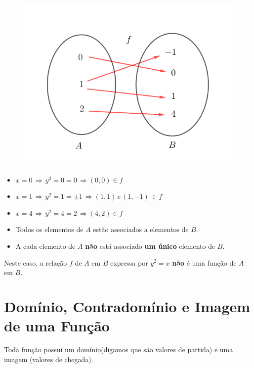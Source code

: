 \begin{enumerate}
\begin{figure}[H]
	\includegraphics[scale=3.5]{imagens/funcao-ex3.png}

\end{figure}

\begin{itemize}
\item $x= 0 \, \Rightarrow \,y^2 = 0 = 0 \, \Rightarrow (0,0) \in f $
\item $x= 1 \, \Rightarrow \,y^2 = 1 = \pm 1  \, \Rightarrow (1,1)\, \text{e} \, (1,-1)\, \in f$
\item $x= 4 \, \Rightarrow \,y^2 = 4 = 2  \, \Rightarrow (4,2) \in f$

\item Todos os elementos de $A$ estão associados a elementos de $B$.
\item A cada elemento de $A$ \textbf{não} está associado \textbf{um único} elemento de $B$.
\end{itemize}
Neste caso, a relação $f$ de $A$ em $B$ expressa por $y^2=x$ \textbf{não} é uma função de $A$ em $B$.

\end{enumerate}

\section{Domínio, Contradomínio e Imagem de uma Função}

Toda função possui um domínio(digamos que são valores de partida) e uma imagem (valores de chegada).


